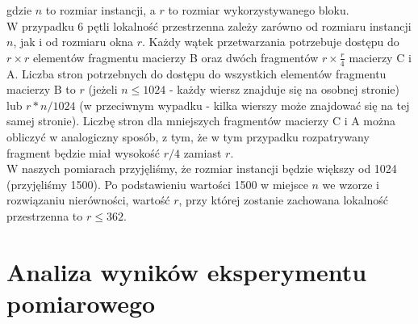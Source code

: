 \documentclass[10pt,a4paper]{article}
\begin{document}
gdzie $n$ to rozmiar instancji, a $r$ to rozmiar wykorzystywanego bloku.\\

W przypadku 6 pętli lokalność przestrzenna zależy zarówno od rozmiaru instancji $n$, jak i od rozmiaru 
okna $r$. Każdy wątek przetwarzania potrzebuje dostępu do $r \times r$ elementów fragmentu macierzy B oraz
dwóch fragmentów $r \times \frac{r}{4}$ macierzy C i A. Liczba stron potrzebnych do dostępu do wszystkich 
elementów fragmentu macierzy B to $r$ (jeżeli $n \leq 1024$ - każdy wiersz znajduje się na osobnej stronie) 
lub $r*n / 1024$ (w przeciwnym wypadku - kilka wierszy może znajdować się na tej samej stronie). Liczbę stron 
dla mniejszych fragmentów macierzy C i A można obliczyć w analogiczny sposób, z tym, że w tym przypadku rozpatrywany
fragment będzie miał wysokość $r/4$ zamiast $r$.\\

W naszych pomiarach przyjęliśmy, że rozmiar instancji będzie większy od 1024 (przyjęliśmy 1500).
Po podstawieniu wartości 1500 w miejsce $n$ we wzorze i rozwiązaniu nierówności, wartość $r$, przy której 
zostanie zachowana lokalność przestrzenna to $r \leq 362$.
\\
\section{Analiza wyników eksperymentu pomiarowego}
\end{document}
